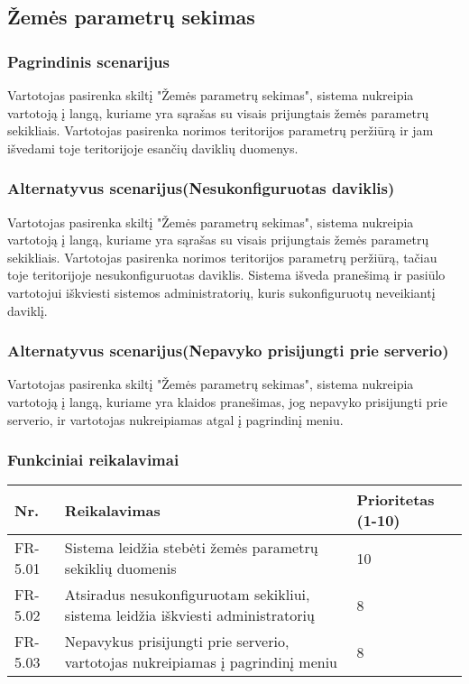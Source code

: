 \documentclass[oneside]{VUMIFPSkursinis}
\begin{document}
\subsection{Žemės parametrų sekimas}
\subsubsection{Pagrindinis scenarijus}
	Vartotojas pasirenka skiltį "Žemės parametrų sekimas", sistema nukreipia vartotoją į langą, kuriame yra sąrašas su visais prijungtais žemės parametrų sekikliais. Vartotojas pasirenka norimos teritorijos parametrų peržiūrą ir jam išvedami toje teritorijoje esančių daviklių duomenys.
\subsubsection{Alternatyvus scenarijus(Nesukonfiguruotas daviklis)}
	Vartotojas pasirenka skiltį "Žemės parametrų sekimas", sistema nukreipia vartotoją į langą, kuriame yra sąrašas su visais prijungtais žemės parametrų sekikliais. Vartotojas pasirenka norimos teritorijos parametrų peržiūrą, tačiau toje teritorijoje nesukonfiguruotas daviklis. Sistema išveda pranešimą ir pasiūlo vartotojui iškviesti sistemos administratorių, kuris sukonfiguruotų neveikiantį daviklį.
\subsubsection{Alternatyvus scenarijus(Nepavyko prisijungti prie serverio)}
	Vartotojas pasirenka skiltį "Žemės parametrų sekimas", sistema nukreipia vartotoją į langą, kuriame yra klaidos pranešimas, jog nepavyko prisijungti prie serverio, ir vartotojas nukreipiamas atgal į pagrindinį meniu.
\subsubsection{Funkciniai reikalavimai}
\begin{table}[htbp]
	\begin{tabularx}{1\textwidth}{ |P{2.5cm}|X|P{3cm }| }  \hline
    Nr. & Reikalavimas &  Prioritetas (1-10)  \\   \hline 
    FR-5.01 & Sistema leidžia stebėti žemės parametrų sekiklių duomenis & 10  \\   \hline
		FR-5.02 & Atsiradus nesukonfiguruotam sekikliui, sistema leidžia iškviesti administratorių & 8 \\  \hline
		FR-5.03 & Nepavykus prisijungti prie serverio, vartotojas nukreipiamas į pagrindinį meniu & 8 \\ \hline
	\end{tabularx}
\end{table}
\end{document}
